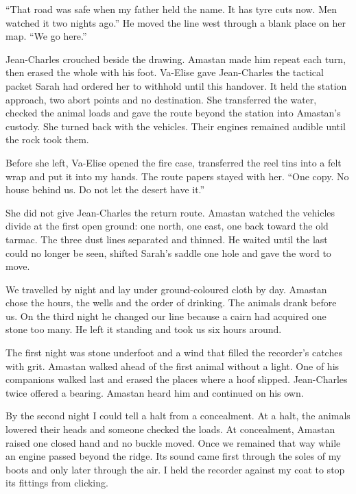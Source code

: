 ``That road was safe when my father held the name. It has tyre cuts now. Men watched it two nights ago.'' He moved the line west through a blank place on her map. ``We go here.''\par

Jean-Charles crouched beside the drawing. Amastan made him repeat each turn, then erased the whole with his foot. Va-Elise gave Jean-Charles the tactical packet Sarah had ordered her to withhold until this handover. It held the station approach, two abort points and no destination. She transferred the water, checked the animal loads and gave the route beyond the station into Amastan's custody. She turned back with the vehicles. Their engines remained audible until the rock took them.\par

Before she left, Va-Elise opened the fire case, transferred the reel tins into a felt wrap and put it into my hands. The route papers stayed with her. ``One copy. No house behind us. Do not let the desert have it.''\par

She did not give Jean-Charles the return route. Amastan watched the vehicles divide at the first open ground: one north, one east, one back toward the old tarmac. The three dust lines separated and thinned. He waited until the last could no longer be seen, shifted Sarah's saddle one hole and gave the word to move.\par

We travelled by night and lay under ground-coloured cloth by day. Amastan chose the hours, the wells and the order of drinking. The animals drank before us. On the third night he changed our line because a cairn had acquired one stone too many. He left it standing and took us six hours around.\par

The first night was stone underfoot and a wind that filled the recorder's catches with grit. Amastan walked ahead of the first animal without a light. One of his companions walked last and erased the places where a hoof slipped. Jean-Charles twice offered a bearing. Amastan heard him and continued on his own.\par

By the second night I could tell a halt from a concealment. At a halt, the animals lowered their heads and someone checked the loads. At concealment, Amastan raised one closed hand and no buckle moved. Once we remained that way while an engine passed beyond the ridge. Its sound came first through the soles of my boots and only later through the air. I held the recorder against my coat to stop its fittings from clicking.\par


